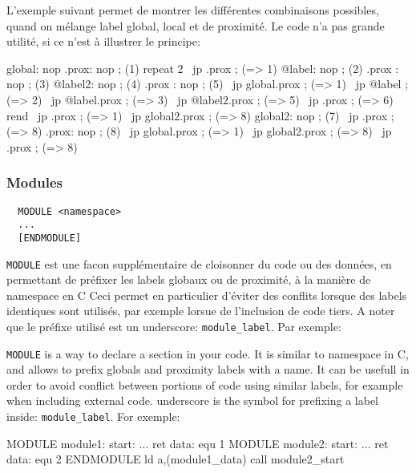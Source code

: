 \begin{xfr}
L'exemple suivant permet de montrer les différentes combinaisons possibles, quand on mélange label global, local et de proximité. 
Le code n'a pas grande utilité, si ce n'est à illustrer le principe:
\end{xfr}

\begin{code}
  global: nop
  .prox:  nop ; (1)
  \medskip
  repeat 2
  \           jp .prox ;  (=> 1)
  @label:   nop  ; (2)
  .prox :   nop  ; (3)
  @label2:  nop  ; (4)
  .prox :   nop  ; (5) 
  \           jp global.prox  ; (=> 1)
  \           jp @label       ; (=> 2)
  \           jp @label.prox  ; (=> 3)
  \           jp @label2.prox ; (=> 5)
  \           jp .prox        ; (=> 6)
  rend
  \medskip
  \           jp .prox        ; (=> 1) 
  \           jp global2.prox ; (=> 8)
  \medskip
  global2:    nop  ; (7)
  \           jp .prox        ; (=> 8) 
  .prox:      nop ; (8)
  \           jp global.prox  ; (=> 1)
  \           jp global2.prox ; (=> 8)
  \           jp .prox        ; (=> 8) 
  \end{code}

  
\subsubsection{Modules}\label{MODULES}

\begin{verbatim}
  MODULE <namespace>
  ...
  [ENDMODULE]
\end{verbatim}

\begin{xfr}

\texttt{MODULE} est une facon supplémentaire de cloisonner du code ou des données, en permettant de préfixer les labels globaux ou de proximité, à la manière de namespace en C
Ceci permet en particulier d'éviter des conflits lorsque des labels identiques sont utilisés, par exemple lorsue de l'inclusion de code tiers.
A noter que le préfixe utilisé est un underscore: \texttt{module_label}. Par exemple:
\end{xfr}

\begin{xen}
\texttt{MODULE} is a way to declare a section in your code. It is similar to namespace in C, and allows to prefix globals and proximity labels with a name.
It can be usefull in order to avoid conflict between portions of code using similar labels, for example when including external code.
underscore is the symbol for prefixing a label inside: \texttt{module_label}. For exemple:
\end{xen}

\begin{code}
  MODULE module1: 
  start:
    ...
    ret
  data: equ 1
\medskip
MODULE module2: 
  start:
    ...
    ret
  data: equ 2
ENDMODULE
\medskip
 ld a,(module1_data)
 call module2_start
\end{code}
